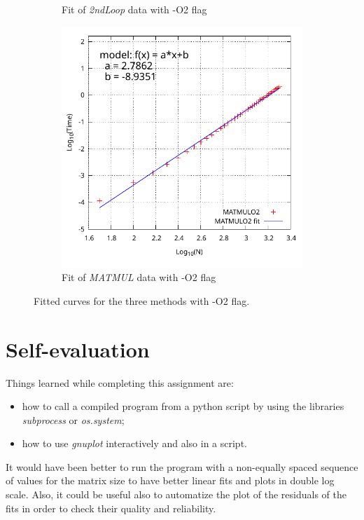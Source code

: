 \documentclass[11pt,a4paper]{article}
\begin{document}
\begin{figure}[t]
\begin{subfigure}{0.47\textwidth}
		\caption{Fit of \textit{2ndLoop} data with -O2 flag}
		\label{fig:fit2ndloopo2}
	\end{subfigure}
	\begin{subfigure}{0.47\textwidth}
		\includegraphics[width=1\linewidth]{Data/Fit_MATMULO2}
		\caption{Fit of \textit{MATMUL} data with -O2 flag}
		\label{fig:fitMATMULo2}
	\end{subfigure}
	\caption{Fitted curves for the three methods with -O2 flag.}
	\label{fig:fitso2}
\end{figure}

\newpage
\section{Self-evaluation} %

Things learned while completing this assignment are:
\begin{itemize}
	\item how to call a compiled program from a python script by using the libraries \textit{subprocess} or \textit{os.system};
	\item how to use \textit{gnuplot} interactively and also in a script.
\end{itemize}

It would have been better to run the program with a non-equally spaced sequence of values for the matrix size to have better linear fits and plots in double log scale.
Also, it could be useful also to automatize the plot of the residuals of the fits in order to check their quality and reliability.
\end{document}
